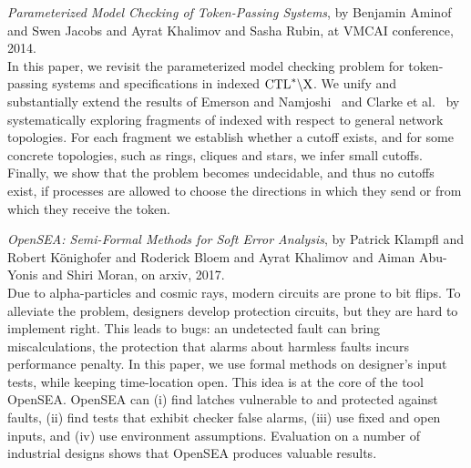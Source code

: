    \emph{Parameterized Model Checking of Token-Passing Systems},
   by Benjamin Aminof and
               Swen Jacobs and
               Ayrat Khalimov and
               Sasha Rubin,
   at VMCAI conference, 2014.\\
In this paper, we revisit the parameterized model checking problem for token-passing
systems and specifications in indexed ${\text{CTL}^*\backslash\text{X}}$.
We unify and substantially extend the results of Emerson and Namjoshi~\cite{Emerso95b,Emerso03}
and Clarke et al.~\cite{Clarke04c}
by systematically exploring fragments of indexed \CTLstarmX with respect to general network topologies.
For each fragment we establish whether a cutoff exists,
and for some concrete topologies, such as rings, cliques and stars, we infer small cutoffs.
Finally, we show that the problem becomes undecidable, and thus no cutoffs exist,
if processes are allowed to choose the directions in which they send or from which they receive the token.

  \emph{OpenSEA: Semi-Formal Methods for Soft Error Analysis},
  by Patrick Klampfl and Robert K\"onighofer and Roderick Bloem and Ayrat Khalimov and
  Aiman Abu-Yonis  and Shiri Moran,
  on arxiv, 2017.\\
Due to alpha-particles and cosmic rays, modern circuits are prone to bit flips.
To alleviate the problem, designers develop protection circuits,
but they are hard to implement right.
This leads to bugs: an undetected fault can bring miscalculations,
the protection that alarms about harmless faults incurs performance penalty.
In this paper, we use formal methods on designer’s input tests, while keeping time-location open.
This idea is at the core of the tool OpenSEA.
OpenSEA can
(i) find latches vulnerable to and protected against faults,
(ii) find tests that exhibit checker false alarms,
(iii) use fixed and open inputs, and
(iv) use environment assumptions.
Evaluation on a number of industrial designs shows that OpenSEA produces valuable results.
\il
